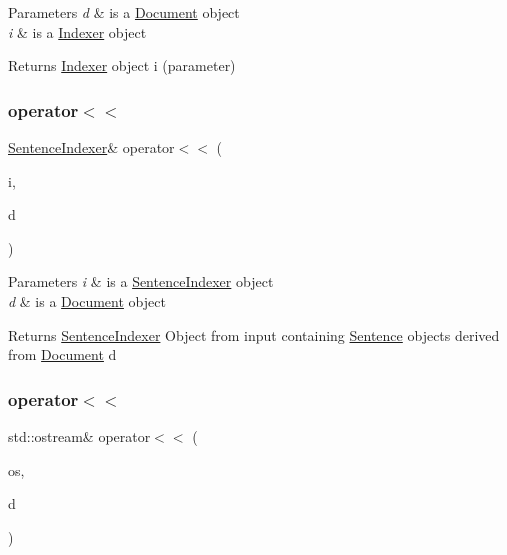 \begin{DoxyParams}{Parameters}
{\em d} & is a \hyperlink{class_document}{Document} object \\
\hline
{\em i} & is a \hyperlink{class_indexer}{Indexer} object \\
\hline
\end{DoxyParams}
\begin{DoxyReturn}{Returns}
\hyperlink{class_indexer}{Indexer} object i (parameter) 
\end{DoxyReturn}
\mbox{\label{class_document_a30be5b0aa936deff7dc8763b554083ef}} 
\subsubsection{\texorpdfstring{operator$<$$<$}{operator<<}\hspace{0.1cm}{\footnotesize\ttfamily [3/4]}}
{\footnotesize\ttfamily \hyperlink{class_sentence_indexer}{Sentence\+Indexer}\& operator$<$$<$ (\begin{DoxyParamCaption}\item[{\hyperlink{class_sentence_indexer}{Sentence\+Indexer} \&}]{i,  }\item[{const \hyperlink{class_document}{Document} \&}]{d }\end{DoxyParamCaption})\hspace{0.3cm}{\ttfamily [friend]}}


\begin{DoxyParams}{Parameters}
{\em i} & is a \hyperlink{class_sentence_indexer}{Sentence\+Indexer} object \\
\hline
{\em d} & is a \hyperlink{class_document}{Document} object \\
\hline
\end{DoxyParams}
\begin{DoxyReturn}{Returns}
\hyperlink{class_sentence_indexer}{Sentence\+Indexer} Object from input containing \hyperlink{class_sentence}{Sentence} objects derived from \hyperlink{class_document}{Document} d 
\end{DoxyReturn}
\mbox{\label{class_document_aa87204fbda2f471a4c7a4499d97c8c27}} 
\subsubsection{\texorpdfstring{operator$<$$<$}{operator<<}\hspace{0.1cm}{\footnotesize\ttfamily [4/4]}}
{\footnotesize\ttfamily std\+::ostream\& operator$<$$<$ (\begin{DoxyParamCaption}\item[{std\+::ostream \&}]{os,  }\item[{const \hyperlink{class_document}{Document} \&}]{d }\end{DoxyParamCaption})\hspace{0.3cm}{\ttfamily [friend]}}



